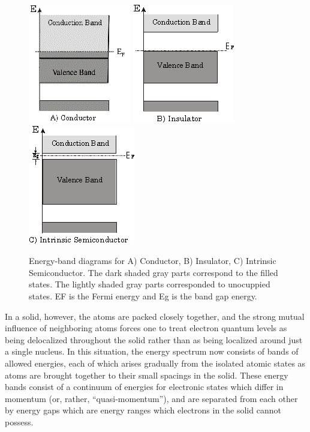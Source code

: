 \documentclass{../lab}
\begin{document}
\begin{figure}[h]
    \includegraphics[width=0.33\linewidth]{images/EnergyBandConductor.png}
    \includegraphics[width=0.33\linewidth]{images/EnergyBandInsulator.png}
    \includegraphics[width=0.33\linewidth]{images/EnergyBandSemiconductor.png}
    \caption{Energy-band diagrams for A) Conductor, B) Insulator, C) Intrinsic Semiconductor. The dark shaded gray parts correspond to the filled states. The lightly shaded gray parts corresponded to unocuppied states. EF is the Fermi energy and Eg is the band gap energy.}
    \label{energyBands}
\end{figure}

In a solid, however, the atoms are packed closely together, and the strong mutual influence of neighboring atoms forces one to treat electron quantum levels as being delocalized throughout the solid rather than as being localized around just a single nucleus. In this situation, the energy spectrum now consists of bands of allowed energies, each of which arises gradually from the isolated atomic states as atoms are brought together to their small spacings in the solid. These energy bands consist of a continuum of energies for electronic states which differ in momentum (or, rather, ``quasi-momentum''), and are separated from each other by energy gaps which are energy ranges which electrons in the solid cannot possess.
\end{document}
